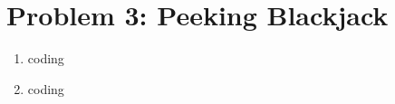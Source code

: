 \documentclass[10pt]{article}
\begin{document}
\section*{\normalsize Problem 3: Peeking Blackjack}

\begin{enumerate}[label=(\alph*)]

  \item coding
  
  \item coding
		
\end{enumerate}
\iffalse
\section*{\normalsize Problem 4: Learning to Play Blackjack}

So far, we've seen how MDP algorithms can take an MDP which describes the full dynamics of the game and return an optimal policy. But suppose you go into a casino, and no one tells you the rewards nor the transitions. We will see how reinforcement learning can allow you to play the game and learn its rules and strategy at the same time! 

\begin{enumerate}[label=(\alph*)]

  \item coding
  
  \item
  
  \item coding
  
  \item
		
\end{enumerate}
\fi
\end{document}
